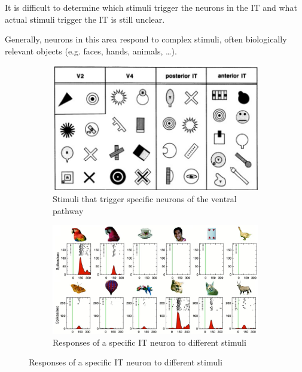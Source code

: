 \begin{remark}
    It is difficult to determine which stimuli trigger the neurons in the IT and
    what actual stimuli trigger the IT is still unclear.

    Generally, neurons in this area respond to complex stimuli, often biologically relevant objects (e.g. faces, hands, animals, \dots).
    
    \begin{figure}[H]
        \centering
        \begin{subfigure}{0.35\linewidth}
            \centering
            \includegraphics[width=0.95\linewidth]{./img/vision_complexity.png}
            \caption{Stimuli that trigger specific neurons of the ventral pathway}
        \end{subfigure}
        \begin{subfigure}{0.6\linewidth}
            \centering
            \includegraphics[width=0.95\linewidth]{./img/it_response.png}
            \caption{Responses of a specific IT neuron to different stimuli}
        \end{subfigure}
    \end{figure}
\end{remark}


